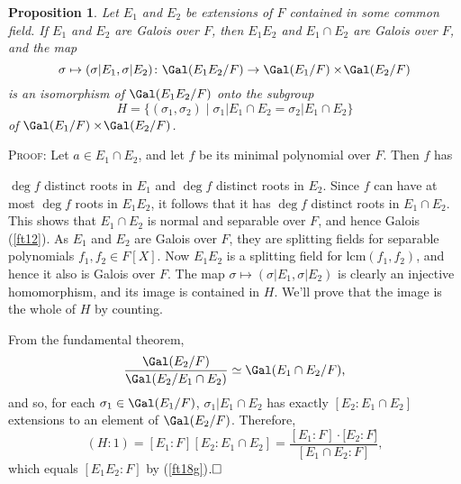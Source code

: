 \documentclass[a4paper,11pt,final,openany]{memoir}
\newtheorem{proposition}[X]{Proposition}
\theoremstyle{nonumberplain}
\begin{document}
\begin{proposition}
\label{ft18h}Let $E_{1}$ and $E_{2}$ be extensions of $F$ contained in some
common field. If $E_{1}$ and $E_{2}$ are Galois over $F$, then $E_{1}E_{2}$
and $E_{1}\cap E_{2}$ are Galois over $F$, and the map
\[
\sigma\mapsto(\sigma|E_{1},\sigma|E_{2})\colon\Gal(E_{1}E_{2}/F)\rightarrow
\Gal(E_{1}/F)\times\!\Gal(E_{2}/F)
\]
is an isomorphism of $\Gal(E_{1}E_{2}/F)$ onto the subgroup%
\[
H=\{(\sigma_{1},\sigma_{2})\mid\sigma_{1}|E_{1}\cap E_{2}=\sigma_{2}|E_{1}\cap
E_{2}\}
\]
of $\Gal(E_{1}/F)\times\!\Gal(E_{2}/F)$.
\end{proposition}

\noindent\textsc{Proof: }Let $a\in E_{1}\cap E_{2}$, and let $f$ be its
minimal polynomial over $F$. Then $f$ has

\noindent\begin{minipage}[t]{4.0in}
$\deg f$ distinct roots in $E_{1}$ and $\deg
f$ distinct roots in $E_{2}$. Since $f$ can have at most $\deg f$ roots in
$E_{1}E_{2}$, it follows that it has $\deg f$ distinct roots in $E_{1}\cap
E_{2}$. This shows that $E_{1}\cap E_{2}$ is normal and separable over $F$,
and hence Galois (\ref{ft12}).
As $E_{1}$ and $E_{2}$ are Galois over $F$, they are splitting fields for
separable polynomials $f_{1},f_{2}\in F[X]$. Now $E_{1}E_{2}$ is a splitting
field for $\textrm{lcm}(f_{1},f_{2})$, and hence it also is Galois over $F$.
The map $\sigma\mapsto(\sigma|E_{1},\sigma|E_{2})$ is clearly an injective
homomorphism, and its image is contained in $H$. We'll prove that the image is
the whole of $H$ by counting.
\end{minipage}
\begin{minipage}[t]{1.5in}
\end{minipage}


From the fundamental theorem,
\[
\frac{\Gal(E_{2}/F)}{\Gal(E_{2}/E_{1}\cap E_{2})}\simeq\Gal(E_{1}\cap
E_{2}/F)\text{,}%
\]
and so, for each $\sigma_{1}\in\Gal(E_{1}/F)$, $\sigma_{1}|E_{1}\cap E_{2}$
has exactly $[E_{2}\colon E_{1}\cap E_{2}]$ extensions to an element of
$\Gal(E_{2}/F)$. Therefore,
\[
(H\colon1)=[E_{1}\colon F][E_{2}\colon E_{1}\cap E_{2}]=\frac{[E_{1}\colon
F]\cdot\lbrack E_{2}\colon F]}{[E_{1}\cap E_{2}\colon F]},
\]
which equals $[E_{1}E_{2}\colon F]$ by (\ref{ft18g})$.\hfill\square$
\end{document}
